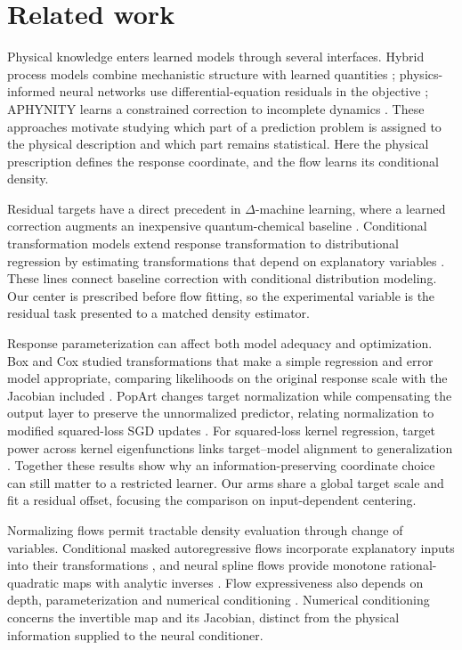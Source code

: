 \section{Related work}
\label{sec:related_target_centering}

Physical knowledge enters learned models through several interfaces. Hybrid
process models combine mechanistic structure with learned quantities
\citep{PsichogiosUngar1992}; physics-informed neural networks use
differential-equation residuals in the objective
\citep{RaissiPerdikarisKarniadakis2019}; APHYNITY learns a constrained
correction to incomplete dynamics \citep{YinEtAl2021}. These approaches motivate
studying which part of a prediction problem is assigned to the physical
description and which part remains statistical. Here the physical prescription
defines the response coordinate, and the flow learns its conditional density.

Residual targets have a direct precedent in $\Delta$-machine learning, where
a learned correction augments an inexpensive quantum-chemical baseline
\citep{RamakrishnanEtAl2015}. Conditional transformation models extend response
transformation to distributional regression by estimating transformations
that depend on explanatory variables \citep{HothornKneibBuhlmann2014}.
These lines connect baseline correction with conditional distribution
modeling. Our center is prescribed before flow fitting, so the experimental
variable is the residual task presented to a matched density estimator.

Response parameterization can affect both model adequacy and optimization.
Box and Cox studied transformations that make a simple regression and error
model appropriate, comparing likelihoods on the original response scale with
the Jacobian included \citep{BoxCox1964}. PopArt changes target normalization
while compensating the output layer to preserve the unnormalized predictor,
relating normalization to modified squared-loss SGD updates
\citep{VanHasseltEtAl2016}. For squared-loss kernel regression, target power
across kernel eigenfunctions links target--model alignment to generalization
\citep{CanatarBordelonPehlevan2021}. Together these results show why an
information-preserving coordinate choice can still matter to a restricted
learner. Our arms share a global target scale and fit a residual offset,
focusing the comparison on input-dependent centering.

Normalizing flows permit tractable density evaluation through change of
variables. Conditional masked autoregressive flows incorporate explanatory
inputs into their transformations \citep{PapamakariosPavlakouMurray2017},
and neural spline flows provide monotone rational-quadratic maps with analytic
inverses \citep{DurkanEtAl2019}. Flow expressiveness also depends on depth,
parameterization and numerical conditioning \citep{KoehlerMehtaRisteski2021}.
Numerical conditioning concerns the invertible map and its Jacobian, distinct
from the physical information supplied to the neural conditioner.

